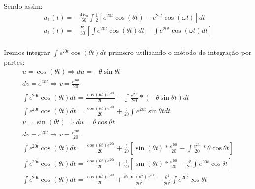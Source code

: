 \documentclass{abntex2}
\begin{document}
\Large Sendo assim:\\
\begin{eqnarray*}
    u_1(t) = -\frac{4E_0}{60}{\int}\frac{1}{2}[e^{20t}\cos{(\theta t)} - e^{20t}\cos{(\omega t)}]dt\\
    u_1(t) = -\frac{E_0}{30}\left[{\int}e^{20t}\cos{(\theta t)}dt - \int e^{20t}\cos{(\omega t)}dt\right]\\
\end{eqnarray*}

\Large Iremos integrar ${\int}e^{20t}\cos{(\theta t)}dt$ primeiro utilizando o método de integração por partes:\\
\begin{eqnarray*}
    u = \cos{(\theta t)} \Rightarrow du = -\theta\sin{\theta t}\\
    dv = e^{20t} \Rightarrow v = \frac{e^{20t}}{20}\\
    {\int}e^{20t}\cos{(\theta t)}dt = \frac{\cos{(\theta t)}e^{20t}}{20} - {\int}\frac{e^{20t}}{20}*(-\theta\sin{\theta t})dt\\
    {\int}e^{20t}\cos{(\theta t)}dt =   \frac{\cos{(\theta t)}e^{20t}}{20} + \frac{\theta}{20}{\int}e^{20t}\sin{\theta t}dt\\
    u = \sin{(\theta t)} \Rightarrow du = \theta\cos{\theta t}\\
    dv = e^{20t} \Rightarrow v = \frac{e^{20t}}{20}\\
     {\int}e^{20t}\cos{(\theta t)}dt =   \frac{\cos{(\theta t)}e^{20t}}{20} + \frac{\theta}{20}\left[\sin{(\theta t)}*\frac{e^{20t}}{20} - \int{\frac{e^{20t}}{20}*\theta\cos{\theta t}}\right]\\
     {\int}e^{20t}\cos{(\theta t)}dt =   \frac{\cos{(\theta t)}e^{20t}}{20} + \frac{\theta}{20}\left[\sin{(\theta t)}*\frac{e^{20t}}{20} - \frac{\theta}{20}\int{e^{20t}}\cos{\theta t}\right]\\
     {\int}e^{20t}\cos{(\theta t)}dt =  \frac{\cos{(\theta t)}e^{20t}}{20} +\frac{\theta\sin{(\theta t)}{e^{20t}}}{20^2} - \frac{\theta^2}{20^2}\int{e^{20t}}\cos{\theta t}\\
\end{eqnarray*}
\newpage
\end{document}
